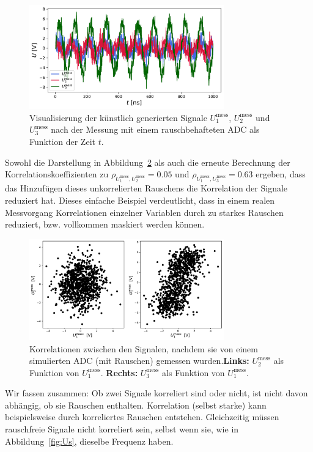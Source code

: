 \begin{figure}[H]
\centering
\includegraphics[width=0.75\textwidth]{Figures/Umess.pdf}
\caption{Visualisierung der künstlich generierten Signale $U_1^{\mathrm{mess}}$, $U_2^{\mathrm{mess}}$ und $U_3^{\mathrm{mess}}$ nach der Messung mit einem rauschbehafteten ADC  als Funktion der Zeit $t$.}
\label{fig:Umess}
\end{figure}

Sowohl die Darstellung in Abbildung~\ref{fig:Umesskorr} als auch die erneute Berechnung der Korrelationskoeffizienten zu $\rho_{U_1^{\mathrm{mess}}, U_2^{\mathrm{mess}}}=0.05$ und $\rho_{U_1^{\mathrm{mess}}, U_3^{\mathrm{mess}}}=0.63$ ergeben, dass das Hinzufügen dieses unkorrelierten Rauschens die Korrelation der Signale reduziert hat. Dieses einfache Beispiel verdeutlicht, dass in einem realen Messvorgang Korrelationen einzelner Variablen durch zu starkes Rauschen reduziert, bzw. vollkommen maskiert werden können.


\begin{figure}[H]
\centering
\includegraphics[width=0.75\textwidth]{Figures/Umesskorrplot.pdf}
\caption{Korrelationen zwischen den Signalen, nachdem sie von einem simulierten ADC (mit Rauschen) gemessen wurden.\textbf{Links:} $U_2^{\mathrm{mess}}$ als Funktion von $U_1^{\mathrm{mess}}$. \textbf{Rechts:} $U_3^{\mathrm{mess}}$ als Funktion von $U_1^{\mathrm{mess}}$.}
\label{fig:Umesskorr}
\end{figure}

Wir fassen zusammen: Ob zwei Signale korreliert sind oder nicht, ist nicht davon abhängig, ob sie Rauschen enthalten. Korrelation (selbst starke) kann beispielsweise durch korreliertes Rauschen entstehen. Gleichzeitig müssen rauschfreie Signale nicht korreliert sein, selbst wenn sie, wie in Abbildung~\ref{fig:Us}, dieselbe Frequenz haben.


